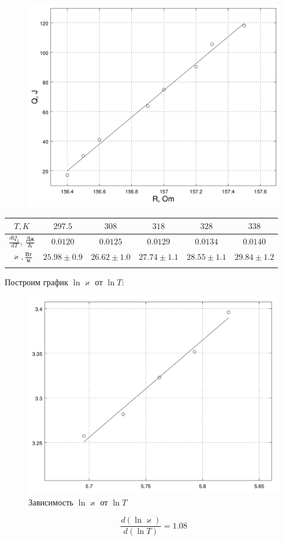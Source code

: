 \documentclass[20pt]{article}
\begin{document}
\begin{figure}[H]
	\includegraphics[scale=0.25]{t5.png}
\end{figure}
\begin{tabular}{|c|c|c|c|c|c|}
\hline
$T, K$ & $297.5$ & $308$ & $318$ & $328$ & $338$    \\\hline	
$\frac{dQ_1}{dT},\ \frac{\text{Дж}}{K}$ & $0.0120$ & $0.0125$ & $0.0129$ & $0.0134$ & $0.0140$  \\\hline
$\varkappa, \frac{\text{Вт}}{\text{м}}$ & $25.98 \pm 0.9$ & $26.62 \pm 1.0$ & $27.74 \pm 1.1$ & $28.55 \pm 1.1$ & $29.84 \pm 1.2$ \\\hline 
\\
\end{tabular}
Построим график $\ln\varkappa$ от $\ln T$:
\begin{figure}[H]
	\centering
	\caption{Зависимость $\ln\varkappa$ от $\ln T$}
	\includegraphics[scale=0.25]{zxc.png}
\end{figure}
\[
	\frac{d\left(\ln \varkappa\right)}{d\left(\ln T\right)} = 1.08
\]
\end{document}
